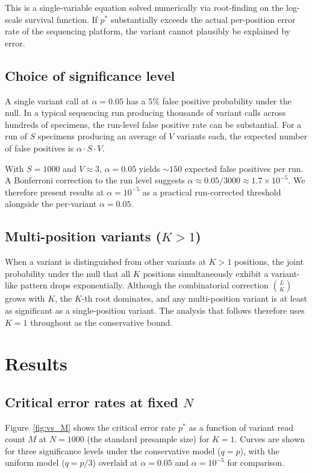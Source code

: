 \documentclass[11pt]{article}
\begin{document}
This is a single-variable equation solved numerically via root-finding on the
log-scale survival function. If $p^*$ substantially exceeds the actual
per-position error rate of the sequencing platform, the variant cannot plausibly
be explained by error.

\subsection{Choice of significance level}

A single variant call at $\alpha = 0.05$ has a 5\% false positive probability
under the null. In a typical sequencing run producing thousands of variant calls
across hundreds of specimens, the run-level false positive rate can be
substantial. For a run of $S$ specimens producing an average of $V$ variants
each, the expected number of false positives is $\alpha \cdot S \cdot V$.

With $S = 1000$ and $V \approx 3$, $\alpha = 0.05$ yields ${\sim}150$ expected
false positives per run. A Bonferroni correction to the run level suggests
$\alpha \approx 0.05 / 3000 \approx 1.7 \times 10^{-5}$. We therefore present
results at $\alpha = 10^{-5}$ as a practical run-corrected threshold alongside
the per-variant $\alpha = 0.05$.

\subsection{Multi-position variants ($K > 1$)}
\label{sec:multiposition}

When a variant is distinguished from other variants at $K > 1$ positions, the
joint probability under the null that all $K$ positions simultaneously exhibit a
variant-like pattern drops exponentially. Although the combinatorial correction
$\binom{L}{K}$ grows with $K$, the $K$-th root dominates, and any multi-position
variant is at least as significant as a single-position variant. The analysis
that follows therefore uses $K = 1$ throughout as the conservative bound.

\section{Results}

\subsection{Critical error rates at fixed $N$}

Figure~\ref{fig:vs_M} shows the critical error rate $p^*$ as a function of
variant read count $M$ at $N = 1000$ (the standard presample size) for $K = 1$.
Curves are shown for three significance levels under the conservative model
($q = p$), with the uniform model ($q = p/3$) overlaid at $\alpha = 0.05$ and
$\alpha = 10^{-5}$ for comparison.
\end{document}
